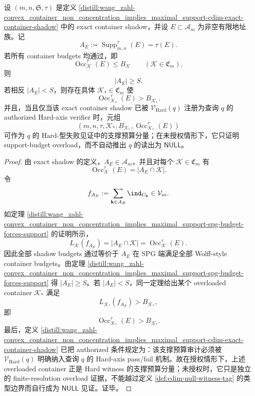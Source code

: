 \begin{proposition}\label{distill:wang_zahl-convex_container_non_concentration_implies_maximal_support-cdim-authorized-hard-axis-witness}
设 \((m,n,\mathfrak S,\tau)\) 是定义 \ref{distill:wang_zahl-convex_container_non_concentration_implies_maximal_support-cdim-exact-container-shadow} 中的 exact container shadow，并设 \(E\subset\mathcal A_m\) 为非空有限地址族。记
\[
A_E:=\operatorname{Supp}_{m,n}^{\tau}(E)=\tau(E).
\]
若所有 container budgets 均通过，即
\[
\operatorname{Occ}_{\mathcal K}^{\tau}(E)\le B_{\mathcal K}\qquad(\mathcal K\in\mathfrak C_m),
\]
则
\[
|A_E|\ge S.
\]
若相反 \(|A_E|<S\)，则存在具体 \(\mathcal K_\ast\in\mathfrak C_m\) 使
\[
\operatorname{Occ}_{\mathcal K_\ast}^{\tau}(E)>B_{\mathcal K_\ast}.
\]
并且，当且仅当该 exact container shadow 已被 \(\mathcal V_{\mathrm{Hard}}(q)\) 注册为查询 \(q\) 的 authorized Hard-axis verifier 时，元组
\[
(m,n,\tau,\mathcal K_\ast,B_{\mathcal K_\ast},
\operatorname{Occ}_{\mathcal K_\ast}^{\tau}(E))
\]
可作为 \(q\) 的 \(\mathrm{Hard}\)-型失败见证中的支撑预算分量；在未授权情形下，它只证明 support-budget overload，而不自动推出 \(q\) 的读出为 \(\mathsf{NULL}\)。
\end{proposition}
\begin{proof}
由 exact shadow 的定义，\(A_E\in\mathscr A_m\)，并且对每个 \(\mathcal K\in\mathfrak C_m\) 有
\[
\operatorname{Occ}_{\mathcal K}^{\tau}(E)=|A_E\cap\mathcal K|.
\]
令
\[
f_{A_E}:=\sum_{\mathbf k\in A_E}\ind_{C_{\mathbf k}}\in\mathcal V_m.
\]
如定理 \ref{distill:wang_zahl-convex_container_non_concentration_implies_maximal_support-spg-budget-forces-support} 的证明所示，
\[
L_{\mathcal K}(f_{A_E})=|A_E\cap\mathcal K|=\operatorname{Occ}_{\mathcal K}^{\tau}(E).
\]
因此全部 shadow budgets 通过等价于 \(A_E\) 在 SPG 端满足全部 Wolff-style container budgets。由定理 \ref{distill:wang_zahl-convex_container_non_concentration_implies_maximal_support-spg-budget-forces-support} 得 \(|A_E|\ge S\)。若 \(|A_E|<S\)，同一定理给出某个 overloaded container \(\mathcal K_\ast\) 满足
\[
L_{\mathcal K_\ast}(f_{A_E})>B_{\mathcal K_\ast},
\]
即
\[
\operatorname{Occ}_{\mathcal K_\ast}^{\tau}(E)>B_{\mathcal K_\ast}.
\]
最后，定义 \ref{distill:wang_zahl-convex_container_non_concentration_implies_maximal_support-cdim-exact-container-shadow} 已把 authorized 条件规定为：该支撑预算审计必须被 \(\mathcal V_{\mathrm{Hard}}(q)\) 明确纳入查询 \(q\) 的 Hard-axis pass/fail 机制。故在授权情形下，上述 overloaded container 正是 Hard witness 的支撑预算分量；未授权时，它只是独立的 finite-resolution overload 证据，不能越过定义 \ref{def:cdim-null-witness-tag} 的类型边界而自行成为 \(\mathsf{NULL}\) 见证。证毕。
\end{proof}

